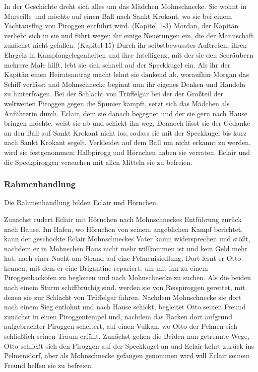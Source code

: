 In der Geschichte dreht sich alles um das Mädchen Mohnschnecke. Sie wohnt in Murseille und möchte auf einen Ball nach Sankt Krokant, wo sie bei einem Yachtausflug von Piroggen entführt wird. (Kapitel 1-3) Mordan, der Kapitän verliebt sich in sie und führt wegen ihr einige Neuerungen ein, die der Mannschaft zunächst nicht gefallen. (Kapitel 15) Durch ihr selbstbewusstes Auftreten, ihren Ehrgeiz in Kampfangelegenheiten und ihre Intelligenz, mit der sie den Seeräubern mehrere Male hilft, lebt sie sich schnell auf der Speckkugel ein. Als ihr der Kapitän einen Heiratsantrag macht lehnt sie dankend ab, woraufhin Morgan das Schiff verlässt und Mohnschnecke beginnt nun ihr eigenes Denken und Handeln zu hinterfragen. Bei der Schlacht von Trüffelgar bei der der Großteil der weltweiten Piroggen gegen die Spunier kämpft, setzt sich das Mädchen als Anführerin durch. Eclair, dem sie danach begegnet und der sie gern nach Hause bringen möchte, weist sie ab und schickt ihn weg. Dennoch lässt sie der Gedanke an den Ball auf Sankt Krokant nicht los, sodass sie mit der Speckkugel bis kurz nach Sankt Krokant segelt. Verkleidet auf dem Ball um nicht erkannt zu werden, wird sie festgenommen: Halbpirogg und Hörnchen haben sie verraten. Eclair und die Speckpiroggen versuchen mit allen Mitteln sie zu befreien.

\subsubsection{Rahmenhandlung}

Die Rahmenhandlung bilden Eclair und Hörnchen.

Zunächst rudert Eclair mit Hörnchen nach Mohnschneckes Entführung zurück nach Hause. Im Hafen, wo Hörnchen von seinem angeblichen Kampf berichtet, kann der geschockte Eclair Mohnschneckes Vater kaum widersprechen und stößt, nachdem er in Mohnschen Haus nicht mehr willkommen ist und kein Geld mehr hat, nach einer Nacht am Strand auf eine Pelmenisiedlung. Dort lernt er Otto kennen, mit dem er eine Brigantine repariert, um mit ihn zu einem Piroggenbackofen zu begleiten und nach Mohnschnecke zu suchen. Als die beiden nach einem Sturm schiffbrüchig sind, werden sie von Reispiroggen gerettet, mit denen sie zur Schlacht von Trüffelgar fahren. Nachdem Mohnschnecke sie dort nach einem Sieg entlohnt und nach Hause schickt, begleitet Otto seinen Freund zunächst in einen Piroggentempel und, nachdem das Backen dort aufgrund aufgebrachter Piroggen scheitert, auf einen Vulkan, wo Otto der Pelmen sich schließlich seinen Traum erfüllt. Zunächst gehen die Beiden nun getrennte Wege, Otto schließt sich den Piroggen auf der Speckkugel an und Eclair kehrt zurück ins Pelmenidorf, aber als Mohnschnecke gefangen genommen wird will Eclair seinem Freund helfen sie zu befreien.

